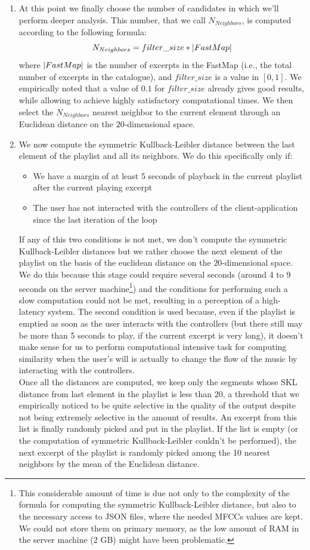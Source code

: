\begin{enumerate}
\item At this point we finally choose the number of candidates in which we'll perform deeper analysis. This number, that we call $N_{Neighbors}$, is computed according to the following formula:
\begin{equation}
N_{Neighbors} = filter\_size * \lvert FastMap\rvert
\end{equation} 
where $\lvert FastMap\rvert$ is the number of excerpts in the FastMap (i.e., the total number of excerpts in the catalogue), and $filter\_size$ is a value in $[0, 1]$. We empirically noted that a value of $0.1$ for $filter\_size$ already gives good results, while allowing to achieve highly satisfactory computational times. We then select the $N_{Neighbors}$ nearest neighbor to the current element through an Euclidean distance on the $20$-dimensional space. 
\item We now compute the symmetric Kullback-Leibler distance between the last element of the playlist and all its neighbors. We do this specifically only if:
\begin{itemize}
\item We have a margin of at least 5 seconds of playback in the current playlist after the current playing excerpt
\item The user has not interacted with the controllers of the client-application since the last iteration of the loop
\end{itemize}
If any of this two conditions is not met, we don't compute the symmetric Kullback-Leibler distances but we rather choose the next element of the playlist on the basis of the euclidean distance on the $20$-dimensional space. We do this because this stage could require several seconds (around 4 to 9 seconds on the server machine\footnote{This considerable amount of time is due not only to the complexity of the formula for computing the symmetric Kullback-Leibler distance, but also to the necessary access to JSON files, where the needed MFCCs values are kept. We could not store them on primary memory, as the low amount of RAM in the server machine (2 GB) might have been problematic.}) and the conditions for performing such a slow computation could not be met, resulting in a perception of a high-latency system. The second condition is used because, even if the playlist is emptied as soon as the user interacts with the controllers (but there still may be more than 5 seconds to play, if the current excerpt is very long), it doesn't make sense for us to perform computational intensive task for computing similarity when the user's will is actually to change the flow of the music by interacting with the controllers. \\ Once all the distances are computed, we keep only the segments whose SKL distance from last element in the playlist is less than 20, a threshold that we empirically noticed to be quite selective in the quality of the output despite not being extremely selective in the amount of results. An excerpt from this list is finally randomly picked and put in the playlist. If the list is empty (or the computation of symmetric Kullback-Leibler couldn't be performed), the next excerpt of the playlist is randomly picked among the 10 nearest neighbors by the mean of the Euclidean distance. 

\end{enumerate}
